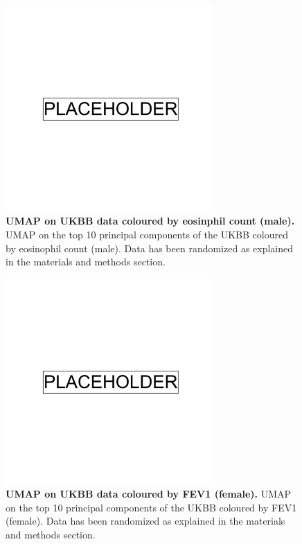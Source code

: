 \newpage

\begin{figure}[ht]
    \centering
    \includegraphics[width=0.7\textwidth]{placeholder.png}
    \caption[UMAP on UKBB data coloured by eosinphil count (male)]{\textbf{UMAP on UKBB data coloured by eosinphil count (male).} UMAP on the top 10 principal components of the UKBB coloured by eosinophil count (male). Data has been randomized as explained in the materials and methods section.}
    \label{fig:supp_ukbb_eosinophill_m}
\end{figure}

\newpage

\begin{figure}[ht]
    \centering
    \includegraphics[width=0.7\textwidth]{placeholder.png}
    \caption[UMAP on UKBB data coloured by FEV1 (female)]{\textbf{UMAP on UKBB data coloured by FEV1 (female).} UMAP on the top 10 principal components of the UKBB coloured by FEV1 (female). Data has been randomized as explained in the materials and methods section.}
    \label{fig:supp_ukbb_fev_f}
\end{figure}

